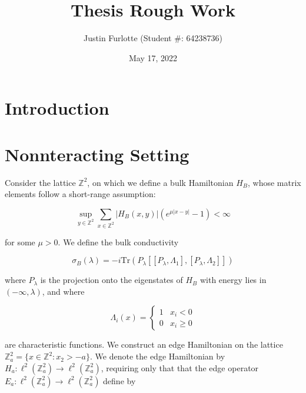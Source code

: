 \documentclass[12pt, letterpaper]{article}
\title{Thesis Rough Work}
\author{Justin Furlotte (Student \#: 64238736)}
\date{May 17, 2022}
\begin{document}
\begin{titlepage}
\maketitle
\end{titlepage}

\newtheorem{theorem}{Theorem}
\newtheorem{corollary}{Corollary}
\newtheorem{lemma}{Lemma}
\newtheorem{proposition}{Proposition}
\newtheorem{assumption}{Assumption}
 
\newcommand{\C}{\mathbb{C}}
\newcommand{\Tr}{\text{Tr}}
\newcommand{\eps}{\varepsilon}
\newcommand{\R}{\mathbb{R}}
\newcommand{\N}{\mathbb{N}}
\newcommand{\Z}{\mathbb{Z}}
\newcommand{\norm}[1]{\lVert #1 \rVert}
\newcommand{\One}{\mathbbm{1}}
\newcommand{\Var}{\text{Var}}
\newcommand{\F}{\mathcal{F}}
\newcommand{\G}{\mathcal{G}}
\newcommand{\U}{\mathcal{U}}


\graphicspath{ {c:/user/justin/grad school/Thesis} }

\section{Introduction}

\section{Nonnteracting Setting}


Consider the lattice $\Z^2$, on which we define a bulk Hamiltonian $H_B$, whose matrix elements follow a short-range assumption:

\[\sup_{y\in\Z^2}\sum_{x\in\Z^2}|H_B(x,y)|(e^{\mu|x-y|}-1) < \infty\]

for some $\mu>0$. We define the bulk conductivity

\[\sigma_B(\lambda) = -i\Tr(P_\lambda[[P_\lambda,\Lambda_1],[P_\lambda,\Lambda_2]])\]

where $P_\lambda$ is the projection onto the eigenstates of $H_B$ with energy lies in $(-\infty,\lambda)$, and where 

\[\Lambda_i(x) = \begin{cases} 1 & x_i < 0\\ 0 & x_i \geq 0\end{cases}\]

are characteristic functions. We construct an edge Hamiltonian on the lattice $\Z^2_a = \{x \in \Z^2 : x_2 > -a\}$. We denote the edge Hamiltonian by $H_a:\ell^2(\Z^2_a) \to \ell^2(\Z^2_a)$, requiring only that that the edge operator $E_a:\ell^2(\Z^2_a)\to\ell^2(\Z^2_a)$ define by 
\end{document}
